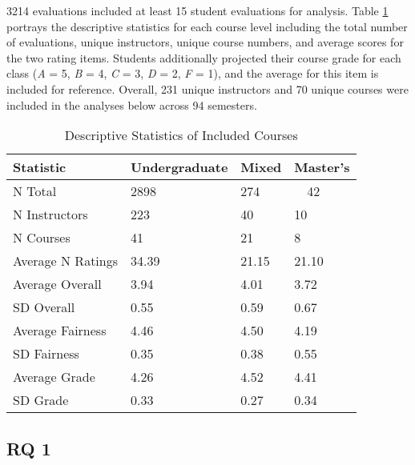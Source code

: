 \documentclass[
  man]{apa7}
\begin{document}
3214 evaluations included at least 15 student evaluations
for analysis. Table \ref{tab:table1} portrays the descriptive
statistics for each course level including the total number of
evaluations, unique instructors, unique course numbers, and average
scores for the two rating items. Students additionally projected their
course grade for each class (\emph{A} = 5, \emph{B} = 4, \emph{C} = 3, \emph{D} = 2, \emph{F} =
1), and the average for this item is included for reference. Overall,
231 unique instructors and
70 unique courses were included in
the analyses below across 94
semesters.

\begin{table}[tbp]

\begin{center}
\begin{threeparttable}

\caption{\label{tab:table1}Descriptive Statistics of Included Courses}

\begin{tabular}{llll}
\toprule
Statistic & Undergraduate & Mixed & Master's\\
\midrule
N Total & 2898 & 274 & \ \ 42\\
N Instructors & 223 & 40 & 10\\
N Courses & 41 & 21 & 8\\
Average N Ratings & 34.39 & 21.15 & 21.10\\
Average Overall & 3.94 & 4.01 & 3.72\\
SD Overall & 0.55 & 0.59 & 0.67\\
Average Fairness & 4.46 & 4.50 & 4.19\\
SD Fairness & 0.35 & 0.38 & 0.55\\
Average Grade & 4.26 & 4.52 & 4.41\\
SD Grade & 0.33 & 0.27 & 0.34\\
\bottomrule
\end{tabular}

\end{threeparttable}
\end{center}

\end{table}

\hypertarget{rq-1-1}{%
\subsection{RQ 1}\label{rq-1-1}}
\end{document}
